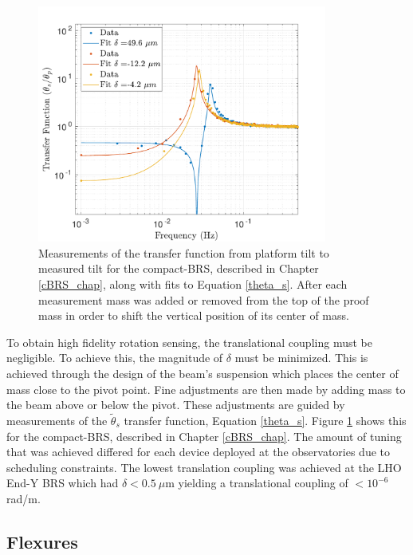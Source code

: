 \documentclass [12pt, proquest]{uwthesis}[2019]
\begin{document}
\begin{figure}[!h]
\begin{center}
 \includegraphics[width=0.85\textwidth]{cBRS_TransferFunction.pdf}
\caption[Transfer function from platform tilt to measured tilt for the cBRS]{Measurements of the transfer function from platform tilt to measured tilt for the compact-BRS, described in Chapter \ref{cBRS_chap}, along with fits to Equation \ref{theta_s}. After each measurement mass was added or removed from the top of the proof mass in order to shift the vertical position of its center of mass.}
\label{TransferFunction}
\end{center}
\end{figure}

To obtain high fidelity rotation sensing, the translational coupling must be negligible. To achieve this, the magnitude of $\delta$ must be minimized. This is achieved through the design of the beam's suspension which places the center of mass close to the pivot point. Fine adjustments are then made by adding mass to the beam above or below the pivot. These adjustments are guided by measurements of the $\tilde{\theta}_s$ transfer function, Equation \ref{theta_s}. Figure \ref{TransferFunction} shows this for the compact-BRS, described in Chapter \ref{cBRS_chap}. The amount of tuning that was achieved differed for each device deployed at the observatories due to scheduling constraints. The lowest translation coupling was achieved at the LHO End-Y BRS which had $\delta<0.5\ \mu$m yielding a translational coupling of $<10^{-6}$ rad/m.

\subsection{Flexures}\label{flex}
\end{document}
